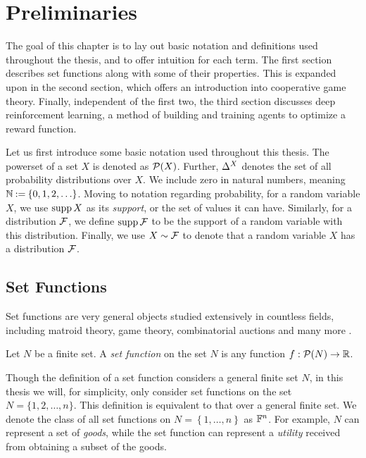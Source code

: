 \chapter{Preliminaries}
\label{chap:prel}

The goal of this chapter is to lay out basic notation and definitions used throughout the thesis, and to offer intuition for each term.
The first section describes set functions along with some of their properties.
This is expanded upon in the second section, which offers an introduction into cooperative game theory.
Finally, independent of the first two, the third section discusses deep reinforcement learning, a method of building and training agents to optimize a reward function.

Let us first introduce some basic notation used throughout this thesis.
The powerset of a set $ X $ is denoted as $ \mathcal{P}\!\left(X\right) $.
Further, $ \Delta^{X} $ denotes the set of all probability distributions over $ X $.
We include zero in natural numbers, meaning $\mathbb{N} \mathbin{:=} \left\{ 0,1,2,\ldots \right\}$.
Moving to notation regarding probability, for a random variable $ X $, we use $ \operatorname{supp} X $ as its \emph{support}, or the set of values it can have.
Similarly, for a distribution $ \mathcal{F} $, we define $ \operatorname{supp} \mathcal{F} $ to be the support of a random variable with this distribution.
Finally, we use $ X \sim \mathcal{F} $ to denote that a random variable $ X $ has a distribution $ \mathcal{F} $.

\section{Set Functions}

Set functions are very general objects studied extensively in countless fields, including
matroid theory, game theory, combinatorial auctions and many more \citep{10.1093/acprof:oso/9780198566946.001.0001,grabisch2016set,peters2015game,doi:10.1287/ijoc.15.3.284.16077}.

\begin{defi}
	Let $ N $ be a finite set.
	A \emph{set function} on the set $ N $ is any function $ f: \mathcal{P}\!\left(N\right) \to \mathbb{R} $.
\end{defi}

Though the definition of a set function considers a general finite set $ N $, in this thesis we will, for simplicity, only consider set functions on the set $ N = \{1, 2, \ldots, n\} $.
This definition is equivalent to that over a general finite set.
We denote the class of all set functions on $ N = \left\{ 1, \ldots, n \right\} $ as $ \mathbb{F}^n $.
For example, $ N $ can represent a set of \emph{goods}, while the set function can represent a \emph{utility} received from obtaining a subset of the goods.

